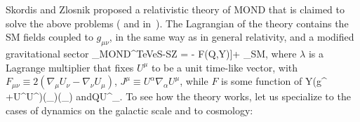 Skordis and Zlosnik proposed a relativistic theory of MOND that is claimed to solve the above problems ( and  in~\cite{MONDth}).
The Lagrangian of the theory contains the SM fields coupled to $g_{\mu\nu}$, in the same way as in general relativity, and a modified
gravitational sector 
\beq \Lag_{\rm MOND}^{\rm TeVeS-SZ} = \left[
R - \lambda(U_\mu U^\mu+1)-
 \frac{K_B}{2} F^{\mu\nu}F_{\mu\nu} + 
  (2-K_B)  [2 J^\mu (\nabla_\mu\mond)- Y]- F(Q,Y)\right]+ \Lag_{\rm SM},
\eeq
where $\lambda$ is a Lagrange multiplier that fixes $U^\mu$ to be a unit time-like vector,
with $F_{\mu\nu} \equiv 2(\nabla_\mu U_\nu - \nabla_\nu U_\mu)$,
$J^\mu\equiv U^\alpha \nabla_\alpha U^\mu$, while
$F$ is some function of
\beq 
Y\equiv(g^{\mu\nu} +U^\mu U^\nu)(\nabla_\mu\mond)(\nabla_\nu\mond)
\qquad\hbox{and}\qquad Q\equiv U^\mu \nabla_\mu \mond.
\eeq
To see how the theory works, let us specialize to the cases of dynamics on the galactic scale and to cosmology:
